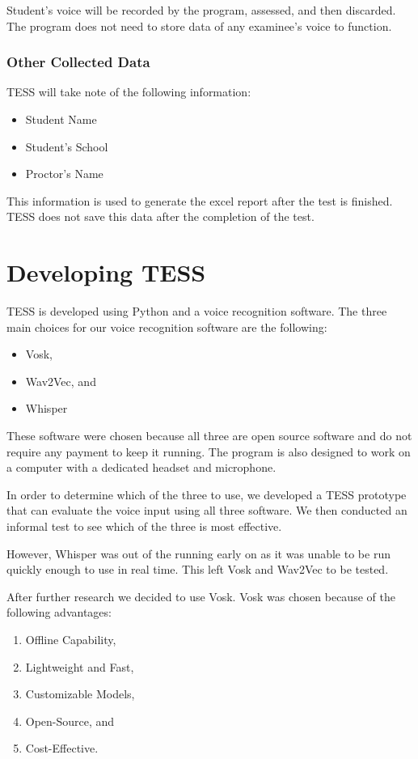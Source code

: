Student’s voice will be recorded by the program, assessed, and then discarded. The program does not need to store data of any examinee’s voice to function.

\subsubsection{Other Collected Data}
TESS will take note of the following information:
\begin{itemize}
\item Student Name
\item Student’s School
\item Proctor’s Name
\end{itemize}
This information is used to generate the excel report after the test is finished. TESS does not save this data after the completion of the test.

\section{Developing TESS}
TESS is developed using Python and a voice recognition software.
The three main choices for our voice recognition software are the following:
\begin{itemize}
\item Vosk,
\item Wav2Vec, and
\item Whisper
\end{itemize}
These software were chosen because all three are open source software and do not require any payment to keep it running.
The program is also designed to work on a computer with a dedicated headset and microphone.

In order to determine which of the three to use, we developed a TESS prototype that can evaluate the voice input using all three software. We then conducted an informal test to see which of the three is most effective.

However, Whisper was out of the running early on as it was unable to be run quickly enough to use in real time. This left Vosk and Wav2Vec to be tested.

After further research we decided to use Vosk. Vosk was chosen because of the following advantages:
\begin{enumerate}
\item Offline Capability,
\item Lightweight and Fast,
\item Customizable Models,
\item Open-Source, and 
\item Cost-Effective.
\end{enumerate}

